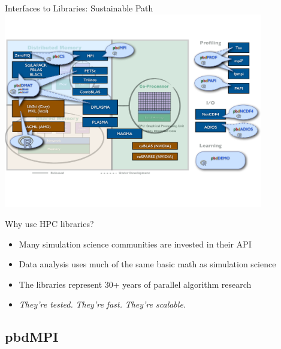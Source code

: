 \begin{frame}{\pbdR Interfaces to Libraries: Sustainable Path}
  \vspace{-1ex}
  \centering\includegraphics[trim=0cm 5cm 0cm 3cm,clip=true,width=0.85\textwidth]
  {../common/pics/hardware/ParallelHardware27.pdf}
  \scriptsize
  \begin{block}{Why use HPC libraries?}
    \begin{itemize}[<+-|alert@+>]
    \item Many simulation science communities are invested in their API
    \item Data analysis uses much of the same basic math as simulation science
    \item The libraries represent 30+ years of parallel algorithm research
    \item \emph{They're tested.} \emph{They're
        fast.}  \emph{They're scalable.}
    \end{itemize}
  \end{block}
\end{frame}

\subsection{pbdMPI}
\makesubcontentsslidessec

